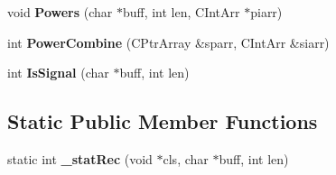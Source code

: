 \begin{DoxyCompactItemize}
\item 
\hypertarget{class_c_recog_a4d7d680cf4266c026eba3a700c83cc7c}{void {\bfseries Powers} (char $\ast$buff, int len, C\-Int\-Arr $\ast$piarr)}\label{class_c_recog_a4d7d680cf4266c026eba3a700c83cc7c}

\item 
\hypertarget{class_c_recog_aa76b15f21816d05c490f37f71b45ea5e}{int {\bfseries Power\-Combine} (C\-Ptr\-Array \&sparr, C\-Int\-Arr \&siarr)}\label{class_c_recog_aa76b15f21816d05c490f37f71b45ea5e}

\item 
\hypertarget{class_c_recog_abb2476a4e87dceea09c657341000c6fb}{int {\bfseries Is\-Signal} (char $\ast$buff, int len)}\label{class_c_recog_abb2476a4e87dceea09c657341000c6fb}

\end{DoxyCompactItemize}
\subsection*{Static Public Member Functions}
\begin{DoxyCompactItemize}
\item 
\hypertarget{class_c_recog_ab0d7f05e4c16b4c6c077fb730c9182d9}{static int {\bfseries \-\_\-stat\-Rec} (void $\ast$cls, char $\ast$buff, int len)}\label{class_c_recog_ab0d7f05e4c16b4c6c077fb730c9182d9}

\end{DoxyCompactItemize}
